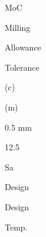 \documentclass[a4paper,portrait,12pt]{article}
\begin{document}
\begin{flushleft}
MoC
\end{flushleft}





\begin{flushleft}
Milling
\end{flushleft}





\begin{flushleft}
Allowance
\end{flushleft}





\begin{flushleft}
Tolerance
\end{flushleft}





\begin{flushleft}
(c)
\end{flushleft}





\begin{flushleft}
(m)
\end{flushleft}





\begin{flushleft}
0.5 mm
\end{flushleft}





12.5





\begin{flushleft}
Sa
\end{flushleft}





\begin{flushleft}
Design
\end{flushleft}





\begin{flushleft}
Design
\end{flushleft}





\begin{flushleft}
Temp.
\end{flushleft}
\end{document}
